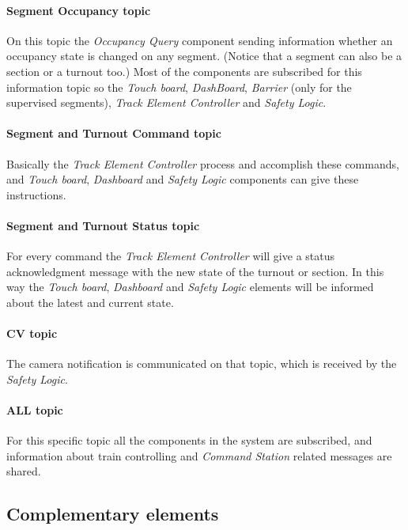 \paragraph{Segment Occupancy topic}
On this topic the \textit{Occupancy Query} component sending information whether an occupancy state is changed on any segment. (Notice that a segment can also be a section or a turnout too.) Most of the components are subscribed for this information topic so the \textit{Touch board}, \textit{DashBoard}, \textit{Barrier} (only for the supervised segments), \textit{Track Element Controller} and \textit{Safety Logic}.

\paragraph{Segment and Turnout Command topic}\label{par:MQTTTopicCommand}
Basically the \textit{Track Element Controller} process and accomplish these commands, and \textit{Touch board}, \textit{Dashboard} and \textit{Safety Logic} components can give these instructions.

\paragraph{Segment and Turnout Status topic}\label{par:MQTTTopicStatus}
For every command the \textit{Track Element Controller} will give a status acknowledgment message with the new state of the turnout or section. In this way the \textit{Touch board}, \textit{Dashboard} and \textit{Safety Logic} elements will be informed about the latest and current state.

\paragraph{CV topic}
The camera notification is communicated on that topic, which is received by the \textit{Safety Logic}.

\paragraph{ALL topic}
For this specific topic all the components in the system are subscribed, and information about train controlling and \textit{Command Station} related messages are shared.

\subsection{Complementary elements}
